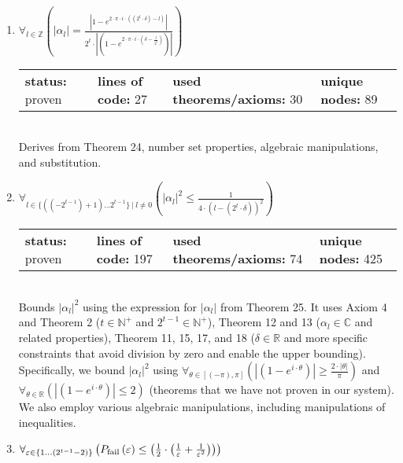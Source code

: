 \documentclass{article}[12pt]
\begin{document}
\begin{enumerate}
\item $\forall_{l \in \mathbb{Z}} \left(\left|\alpha_{l}\right| = \frac{\left|1 - e^{2 \cdot \pi \cdot i \cdot \left(\left(2^{t} \cdot \delta\right) - l\right)}\right|}{2^{t} \cdot \left|\left(1 - e^{2 \cdot \pi \cdot i \cdot \left(\delta - \frac{l}{2^{t}}\right)}\right)\right|}\right)$ \hfill \\
  \begin{tabular}{l | l | l | l}
    \textbf{status:} proven & \textbf{lines of code:} 27 & \textbf{used theorems/axioms:} 30 & \textbf{unique nodes:} 89 
  \end{tabular} \hfill \\
Derives from Theorem 24, number set properties, algebraic manipulations, and substitution.
\item $\forall_{l \in \{\left(\left(-2^{t - 1}\right) + 1\right)\ldots 2^{t - 1}\}~|~l \neq 0} \left(\left|\alpha_{l}\right|^{2} \leq \frac{1}{4 \cdot \left(l - \left(2^{t} \cdot \delta\right)\right)^{2}}\right)$ \hfill \\
  \begin{tabular}{l | l | l | l}
    \textbf{status:} proven & \textbf{lines of code:} 197 & \textbf{used theorems/axioms:} 74 & \textbf{unique nodes:} 425
  \end{tabular} \hfill \\
  Bounds $\lvert \alpha_l \rvert^2$ using the expression for $\lvert \alpha_l \rvert$ from Theorem 25.  It uses Axiom 4 and Theorem 2 ($t \in \mathbb{N}^+$ and $2^{t-1} \in \mathbb{N}^+$), Theorem 12 and 13 ($\alpha_l \in \mathbb{C}$ and related properties), Theorem 11, 15, 17, and 18 ($\delta \in \mathbb{R}$ and more specific constraints that avoid division by zero and enable the upper bounding).  Specifically, we bound $\lvert \alpha_l \rvert^2$ using $\forall_{\theta \in \left[\left(-\pi\right),\pi\right]} \left(\left|\left(1 - e^{i \cdot \theta}\right)\right| \geq \frac{2 \cdot \left|\theta\right|}{\pi}\right)$ and $\forall_{\theta \in \mathbb{R}} \left(\left|\left(1 - e^{i \cdot \theta}\right)\right| \leq 2\right)$ (theorems that we have not proven in our system).  We also employ various algebraic manipulations, including manipulations of inequalities.
\item $\forall_{\varepsilon \in \{1\ldots \left(2^{t - 1} - 2\right)\}} \left(P_{\rm fail}\left(\varepsilon\right) \leq \left(\frac{1}{2} \cdot \left(\frac{1}{\varepsilon} + \frac{1}{\varepsilon^{2}}\right)\right)\right)$ \hfill \\
  \begin{tabular}{l | l | l | l}

\end{tabular}
\end{enumerate}
\end{document}
